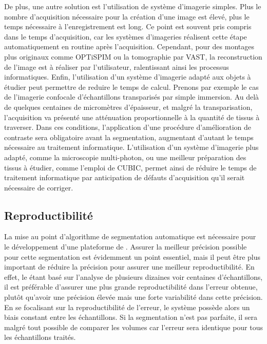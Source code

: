 \documentclass[\main/main.tex]{subfiles}
\begin{document}
%
De plus, une autre solution est l'utilisation de système d'imagerie simples.
%
Plus le nombre d'acquisition nécessaire pour la création d'une image est élevé, plus le temps nécessaire à l'enregistrement est long.
%
Ce point est souvent pris compris dans le temps d'acquisition, car les systèmes d'imageries réalisent cette étape automatiquement en routine après l'acquisition.
%
Cependant, pour des montages plus originaux comme OPTiSPIM ou la tomographie par VAST,
la reconstruction de l'image est à réaliser par l'utilisateur, ralentissant ainsi les processus informatiques.
%
Enfin, l'utilisation d'un système d'imagerie adapté aux objets à étudier peut permettre de reduire le temps de calcul.
%
Prenons par exemple le cas de l'imagerie confocale d'échantillons transparisés par simple immersion.
%
Au delà de quelques centaines de micromètres d'épaisseur, et malgré la transparisation, l'acquisition va présenté une atténuation proportionnelle à la quantité de tissus à traverser.
%
Dans ces conditions, l'application d'une procédure d'amélioration de contraste sera obligatoire avant la segmentation, augmentant d'autant le temps nécessaire au traitement informatique.
%
L'utilisation d'un système d'imagerie plus adapté, comme la microscopie multi-photon, ou une meilleur préparation des tissus à étudier, comme l'emploi de CUBIC, permet ainsi de réduire le temps de traitement informatique par anticipation de défauts d'acquisition qu'il serait nécessaire de corriger.

    \subsection{Reproductibilité}

%
La mise au point d'algorithme de segmentation automatique est nécessaire pour le développement d'une plateforme de \hcs{}.
%
Assurer la meilleur précision possible pour cette segmentation est évidemment un point essentiel, mais il peut être plus important de réduire la précision pour assurer une meilleur reproductibilité.
%
En effet, le \hcs{} étant basé sur l'analyse de plusieurs dizaines voir centaines d'échantillons,
il est préférable d'assurer une plus grande reproductibilité dans l'erreur obtenue, plutôt qu'avoir une précision élevée mais une forte variabilité dans cette précision.
%
En se focalisant sur la reproductibilité de l'erreur, le système possède alors un biais constant entre les échantillons.
%
Si la segmentation n'est pas parfaite, il sera malgré tout possible de comparer les volumes car l'erreur sera identique pour tous les échantillons traités.
\end{document}
